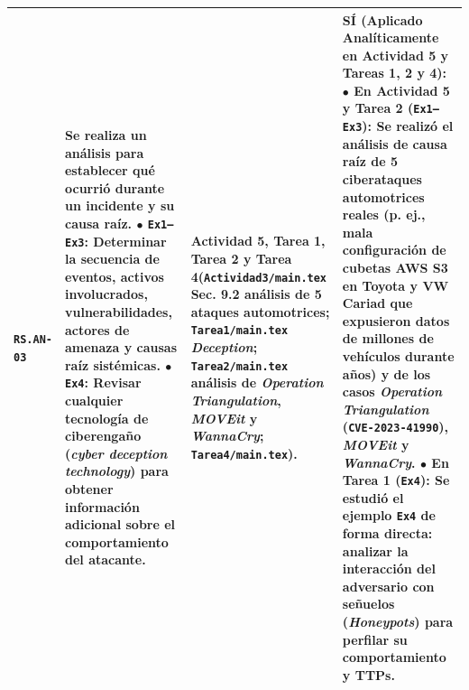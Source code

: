 \documentclass[letterpaper,11pt]{article}
\begin{document}
\begin{longtable}{|C{1.5cm}|L{5.3cm}|L{4.3cm}|L{5.8cm}|}
\texttt{RS.AN-03} &
\textbf{Se realiza un análisis para establecer qué ocurrió durante un incidente y su causa raíz.}\newline
$\bullet$ \texttt{Ex1--Ex3}: Determinar la secuencia de eventos, activos involucrados, vulnerabilidades, actores de amenaza y causas raíz sistémicas.\newline
$\bullet$ \texttt{Ex4}: \textbf{Revisar cualquier tecnología de ciberengaño (\textit{cyber deception technology}) para obtener información adicional sobre el comportamiento del atacante}. &
\textbf{Actividad 5, Tarea 1, Tarea 2 y Tarea 4}\newline (\texttt{Actividad3/main.tex} Sec. 9.2 análisis de 5 ataques automotrices; \texttt{Tarea1/main.tex} \textit{Deception}; \texttt{Tarea2/main.tex} análisis de \textit{Operation Triangulation}, \textit{MOVEit} y \textit{WannaCry}; \texttt{Tarea4/main.tex}). &
\textbf{SÍ (Aplicado Analíticamente en Actividad 5 y Tareas 1, 2 y 4):}\newline
$\bullet$ \textbf{En Actividad 5 y Tarea 2 (\texttt{Ex1--Ex3}):} Se realizó el análisis de causa raíz de 5 ciberataques automotrices reales (p. ej., mala configuración de cubetas AWS S3 en Toyota y VW Cariad que expusieron datos de millones de vehículos durante años) y de los casos \textit{Operation Triangulation} (\texttt{CVE-2023-41990}), \textit{MOVEit} y \textit{WannaCry}.\newline
$\bullet$ \textbf{En Tarea 1 (\texttt{Ex4}):} Se estudió el ejemplo \texttt{Ex4} de forma directa: analizar la interacción del adversario con señuelos (\textit{Honeypots}) para perfilar su comportamiento y TTPs. \\
\hline


\end{longtable}
\end{document}
